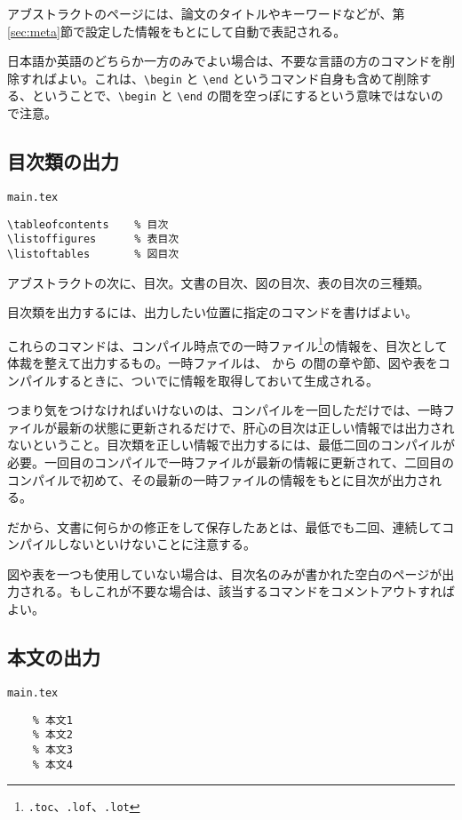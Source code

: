 アブストラクトのページには、論文のタイトルやキーワードなどが、第\ref{sec:meta}節で設定した情報をもとにして自動で表記される。

日本語か英語のどちらか一方のみでよい場合は、不要な言語の方のコマンドを削除すればよい。これは、\verb|\begin| と \verb|\end| というコマンド自身も含めて削除する、ということで、\verb|\begin| と \verb|\end| の間を空っぽにするという意味ではないので注意。



\subsection{目次類の出力}
\label{sec:toc}

\begin{itembox}[l]{{\tt main.tex}}
\begin{verbatim}
\tableofcontents	% 目次
\listoffigures		% 表目次
\listoftables		% 図目次
\end{verbatim}
\end{itembox}

アブストラクトの次に、目次。文書の目次、図の目次、表の目次の三種類。

目次類を出力するには、出力したい位置に指定のコマンドを書けばよい。

これらのコマンドは、コンパイル時点での一時ファイル\footnote{{\tt *.toc}、{\tt *.lof}、{\tt *.lot}}の情報を、目次として体裁を整えて出力するもの。一時ファイルは、\verb|| から \verb|| の間の章や節、図や表をコンパイルするときに、ついでに情報を取得しておいて生成される。

つまり気をつけなければいけないのは、コンパイルを一回しただけでは、一時ファイルが最新の状態に更新されるだけで、肝心の目次は正しい情報では出力されないということ。目次類を正しい情報で出力するには、最低二回のコンパイルが必要。一回目のコンパイルで一時ファイルが最新の情報に更新されて、二回目のコンパイルで初めて、その最新の一時ファイルの情報をもとに目次が出力される。

だから、文書に何らかの修正をして保存したあとは、最低でも二回、連続してコンパイルしないといけないことに注意する。

図や表を一つも使用していない場合は、目次名のみが書かれた空白のページが出力される。もしこれが不要な場合は、該当するコマンドをコメントアウトすればよい。


\subsection{本文の出力}

\begin{itembox}[l]{{\tt main.tex}}
\begin{verbatim}
	% 本文1
	% 本文2
	% 本文3
	% 本文4
\end{verbatim}
\end{itembox}

